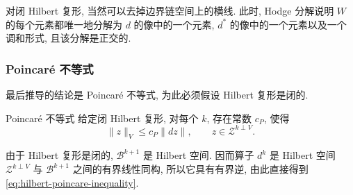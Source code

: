 {对闭 Hilbert 复形, 当然可以去掉边界链空间上的横线. 此时, Hodge 分解说明 $W$ 的每个元素都唯一地分解为 $d$ 的像中的一个元素, $d^*$ 的像中的一个元素以及一个调和形式, 且该分解是正交的.}

\subsubsection{Poincaré {不等式}}\label{subsec:hilbert-poincare-inequality}

{最后推导的结论是 Poincaré 不等式, 为此必须假设 Hilbert 复形是闭的.}

\begin{Theorem}{Poincaré {不等式}}\label{thm:hilbert-complex-poincare}
{给定闭 Hilbert 复形, 对每个 $k$, 存在常数 $c_P$, 使得}
\begin{equation}\label{eq:hilbert-poincare-inequality}
\|z\|_V\leq c_P\|dz\|,\qquad z\in\mathcal Z^{k\perp V}.
\end{equation}
\end{Theorem}

\begin{Proof}
{由于 Hilbert 复形是闭的, $\mathcal B^{k+1}$ 是 Hilbert 空间. 因而算子 $d^k$ 是 Hilbert 空间 $\mathcal Z^{k\perp V}$ 与 $\mathcal B^{k+1}$ 之间的有界线性同构, 所以它具有有界逆, 由此直接得到 \eqref{eq:hilbert-poincare-inequality}.}
\end{Proof}
